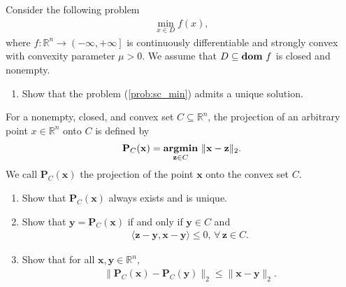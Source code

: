 \documentclass[11pt,letter,notitlepage]{article}
\DeclareMathOperator*{\argmin}{\bf argmin}
\DeclareMathOperator*{\dom}{\bf dom\,}
\newcommand{\proj}[2]{\textbf{P}_{#2} (#1)}
\begin{document}
\begin{exercise}
    Consider the following problem 
    \begin{align}\label{prob:sc_min}
        \min_{x\in D}f(x),
    \end{align}
    where $f:\mathbb{R}^{n} \to \left( -\infty,+\infty \right]$ is continuously differentiable and strongly convex with convexity parameter $\mu>0$. We assume that $D \subseteq \dom f $ is closed and nonempty.
    \begin{enumerate}
        \item Show that the problem (\ref{prob:sc_min}) admits a unique solution.
    \end{enumerate}
	For a nonempty, closed, and convex set $C\subseteq\mathbb{R}^n$, the projection of an arbitrary point $x\in\mathbb{R}^n$ onto $C$ is defined by
	\begin{align*}
	    \proj{\mathbf{x}}{C} = \argmin_{\mathbf{z}\in C}\,\|\mathbf{x}-\mathbf{z}\|_2.
	\end{align*}
    We call $\proj{\mathbf{x}}{C}$ the projection of the point $\mathbf{x}$ onto the convex set $C$. 
    \begin{enumerate}[resume]
        \item Show that $\proj{\mathbf{x}}{C}$ always exists and is unique.
        \item Show that $\mathbf{y}=\proj{\mathbf{x}}{C}$ if and only if $\mathbf{y}\in C$ and 
    		\begin{align*}
    		\langle \mathbf{z}-\mathbf{y}, \mathbf{x}-\mathbf{y}\rangle\leq0,\,\forall\,\mathbf{z}\in C.
    		\end{align*}
    	\item Show that for all $\mathbf{x},\mathbf{y}\in\mathbb{R}^n$,
    	\begin{align*}
    		\|\proj{\mathbf{x}}{C}-\proj{\mathbf{y}}{C}\|_2\leq \|\mathbf{x}-\mathbf{y}\|_2.
    	\end{align*}
    \end{enumerate}
\end{exercise}
\begin{solution}

\end{solution}

\newpage
\end{document}
